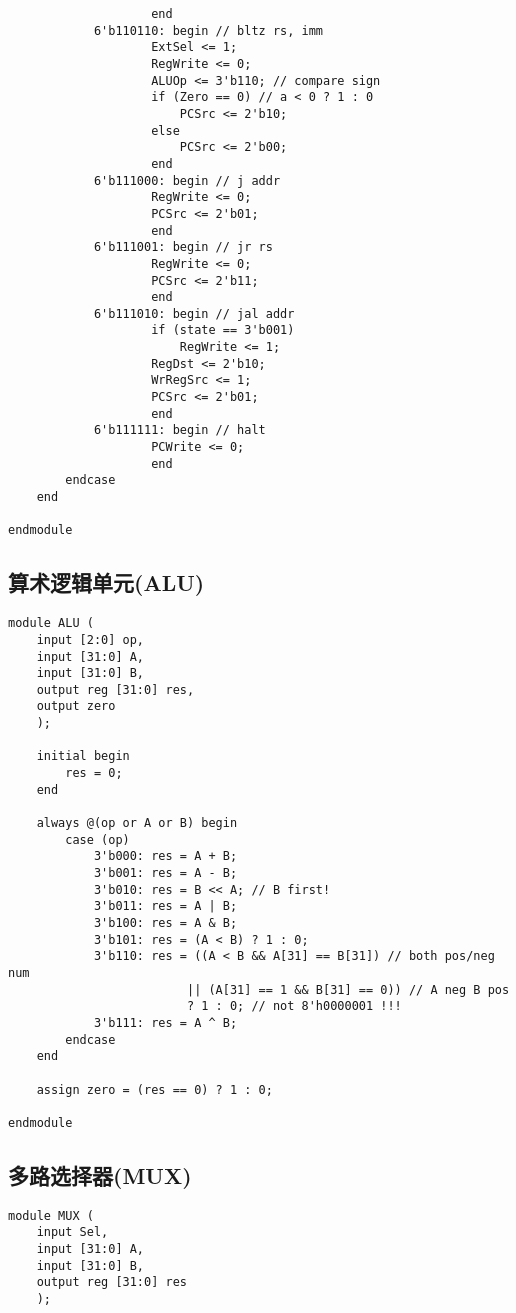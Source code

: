 \begin{multicols}{2}
\begin{lstlisting}
					end
			6'b110110: begin // bltz rs, imm
					ExtSel <= 1;
    				RegWrite <= 0;
    				ALUOp <= 3'b110; // compare sign
                    if (Zero == 0) // a < 0 ? 1 : 0
                        PCSrc <= 2'b10;
                    else
                        PCSrc <= 2'b00;
					end
			6'b111000: begin // j addr
    				RegWrite <= 0;
    				PCSrc <= 2'b01;
					end
            6'b111001: begin // jr rs
                    RegWrite <= 0;
                    PCSrc <= 2'b11;
                    end
            6'b111010: begin // jal addr
                    if (state == 3'b001)
                        RegWrite <= 1;
                    RegDst <= 2'b10;
                    WrRegSrc <= 1;
                    PCSrc <= 2'b01;
                    end
			6'b111111: begin // halt
					PCWrite <= 0;
					end
		endcase
	end
    
endmodule
\end{lstlisting}

\subsection{算术逻辑单元(ALU)}
\begin{lstlisting}
module ALU (
    input [2:0] op,
    input [31:0] A,
    input [31:0] B,
    output reg [31:0] res,
    output zero
    );
    
    initial begin
        res = 0;
    end
    
    always @(op or A or B) begin
        case (op)
            3'b000: res = A + B;
            3'b001: res = A - B;
            3'b010: res = B << A; // B first!
            3'b011: res = A | B;
            3'b100: res = A & B;
            3'b101: res = (A < B) ? 1 : 0;
            3'b110: res = ((A < B && A[31] == B[31]) // both pos/neg num
                         || (A[31] == 1 && B[31] == 0)) // A neg B pos
                         ? 1 : 0; // not 8'h0000001 !!!
            3'b111: res = A ^ B;
        endcase
    end

    assign zero = (res == 0) ? 1 : 0;

endmodule
\end{lstlisting}

\subsection{多路选择器(MUX)}
\begin{lstlisting}
module MUX (
    input Sel,
    input [31:0] A,
    input [31:0] B,
    output reg [31:0] res
    );
    

\end{lstlisting}
\end{multicols}
